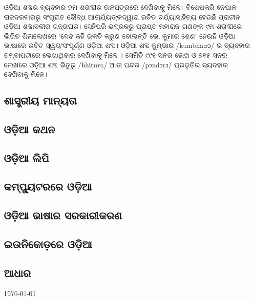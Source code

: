 \documentclass{article}
\begin{document}
ଓଡ଼ିଆ ଶବ୍ଦର ବ୍ୟବହାର ୭ମ ଶତାବ୍ଦୀର ତାଳପତ୍ରରେ ଦେଖିବାକୁ ମିଳେ। ବିଶେଷକରି ନେପାଳ ରାଜଦରବାରରୁ ସଂଗୃହୀତ ବୌଦ୍ଧ ଆଚାର୍ଯ୍ୟଙ୍କଦ୍ୱାରା ରଚିତ ଚର୍ଯ୍ୟାସାହିତ୍ୟ ହେଉଛି ପ୍ରାଚୀନ ଓଡ଼ିଆ ଶବ୍ଦାବଳୀର ଗନ୍ତାଘର। ସେହିପରି ଭଦ୍ରକରୁ ପ୍ରାପ୍ତ ମହାରାଜ ଗଣଙ୍କ ୯ମ ଶତାବ୍ଦୀରେ ଲିଖିତ ଶିଳାଲେଖରେ 'ଦେବ କହି ଭକତି କରୁଣ ବୋଲନ୍ତି ଭୋ କୁମାର ଶେଣ' ହେଉଛି ଓଡ଼ିଆ ଭାଷାରେ ରଚିତ ସ୍ୱୟଂସଂପୂର୍ଣ୍ଣ ଓଡ଼ିଆ ଶବ୍ଦ। ଓଡ଼ିଆ ଶବ୍ଦ କୁମ୍ଭାର \textenglish {/kumbha:rɔ/} ର ବ୍ୟବହାର ତମ୍ବାପଟାରେ ଲେଖାଥିବାର ଦେଖିବାକୁ ମିଳେ । ସେମିତି ୯୯୧ ସନର ଲେଖ ଓ ୭୧୫ ସନର ଲେଖରେ ଓଡ଼ିଆ ଶବ୍ଦ ଭିତୁରୁ \textenglish {/bhituru/} ଆଉ ପନ୍ଦର \textenglish {/pɔndɔrɔ/} ପ୍ରଭୃତିର ବ୍ୟବହାର ଦେଖିବାକୁ ମିଳେ।
\subsection{ଶାସ୍ତ୍ରୀୟ ମାନ୍ୟତା}
\subsection{ଓଡ଼ିଆ କଥନ}
\subsection{ଓଡ଼ିଆ ଲିପି}
\subsection{କମ୍ପ୍ୟୁଟରରେ ଓଡ଼ିଆ}
\subsection{ଓଡ଼ିଆ ଭାଷାର ସରକାରୀକରଣ}
\subsection{ଇଉନିକୋଡ଼ରେ ଓଡ଼ିଆ}
\subsection{ଆଧାର}


\bigskip
\today
\end{document}
